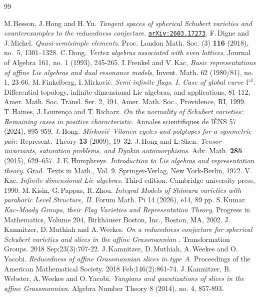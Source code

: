 \documentclass[a4paper, 12pt]{amsart}
\theoremstyle{definition}
\newcommand{\arxiv}[1]{\href{https://arxiv.org/abs/#1}{\texttt{arXiv:#1}}}
\begin{document}
\begin{thebibliography}{99}

 M.\,Besson, J.\,Hong and H.\,Yu. {\it Tangent spaces of spherical Schubert varieties and counterexamples to the reducedness conjecture}. \arxiv{2603.17273}.
 F.\,Digne and J.\,Michel. {\it Quasi-semisimple elements}. Proc. London Math. Soc. (3) {\bf 116} (2018), no.~5, 1301--1328.
C.\,Dong. {\it Vertex algebras associated with even lattices}. Journal of Algebra 161, no. 1 (1993), 245-265.
I.\,Frenkel and V.\,Kac, {\it Basic representations of affine Lie algebras and dual resonance models}, Invent. Math. 62 (1980/81), no. 1, 23-66.
	 M.\,Finkelberg, I.\,Mirkovi\'c.  {\it Semi-infinite flags. I. Case of global curve $\mathbb{P}^1$}. Differential topology, infinite-dimensional Lie algebras, and applications, 81-112, Amer. Math. Soc. Transl. Ser. 2, 194, Amer. Math. Soc.,
Providence, RI, 1999.
T.\,Haines, J.\,Louren\c{c}o and T.\,Richarz. {\it On the normality of Schubert varieties: Remaining cases in positive characteristic}.  Annales scientifiques de l\'ENS 57 (2024), 895-959.
 J.\,Hong. {\it Mirkovi\'c--Vilonen cycles and polytopes for a symmetric pair}. Represent. Theory {\bf 13} (2009), 19--32.
 J.\,Hong and L.\,Shen. {\it Tensor invariants, saturation problems, and Dynkin automorphisms}. Adv. Math. {\bf 285} (2015), 629--657.
J.\,E.\,Humphreys. {\it
Introduction to Lie algebras and representation theory}. Grad. Texts in Math., Vol. 9. Springer-Verlag, New York-Berlin, 1972. 
	 V.\,Kac. {\it Infinite-dimensional Lie algebras}. Third edition. Cambridge university press, 1990.	
	 M.\,Kisin, G.\,Pappas, R.\,Zhou. {\it Integral Models of Shimura varieties with parahoric Level Structure, II}.  Forum Math. Pi 14 (2026), e14, 89 pp. 
		 S.\,Kumar. {\it Kac-Moody Groups, their Flag Varieties and Representation Theory},  Progress in Mathematics, Volume 204, Birkhäuser Boston, Inc., Boston, MA, 2002. 
	J.\,Kamnitzer, D.\,Muthiah and  A.\,Weekes. {\it On a reducedness conjecture for spherical Schubert varieties and slices in the affine Grassmannian }. Transformation Groups. 2018 Sep;23(3):707-22.
J.\,Kamnitzer, D.\,Muthiah, A.\,Weekes and O.\,Yacobi. {\it Reducedness of affine Grassmannian slices in type A}. Proceedings of the American Mathematical Society. 2018 Feb;146(2):861-74.
 J.\,Kamnitzer, B.\,Webster, A.\,Weekes and O.\,Yacobi. {\it Yangians and quantizations of slices in the affine Grassmannian}. Algebra Number Theory 8 (2014), no. 4, 857-893.


\end{thebibliography}
\end{document}
